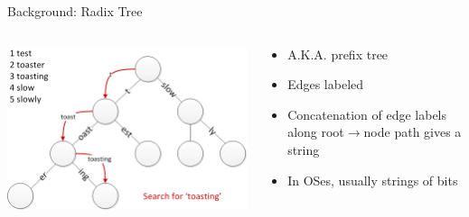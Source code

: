 \documentclass[aspectratio=169]{beamer}
\newcommand{\bi}{\begin{itemize}}
\newcommand{\ei}{\end{itemize}}
\begin{document}
\begin{frame}{Background: Radix Tree}
  \begin{columns}[T]
    \begin{column}{0.5\textwidth}
      \begin{center}
        \includegraphics[scale=0.6]{./figures/Patricia_trie.png}
      \end{center}
    \end{column}
    \begin{column}{0.5\textwidth}
      \bi
    \item A.K.A. prefix tree
      \pause
    \item Edges labeled
      \pause
    \item Concatenation of edge labels along root$\rightarrow$node path gives a string
      \pause
    \item In OSes, usually strings of bits
      \ei
    \end{column}
  \end{columns}
\end{frame}
\end{document}
